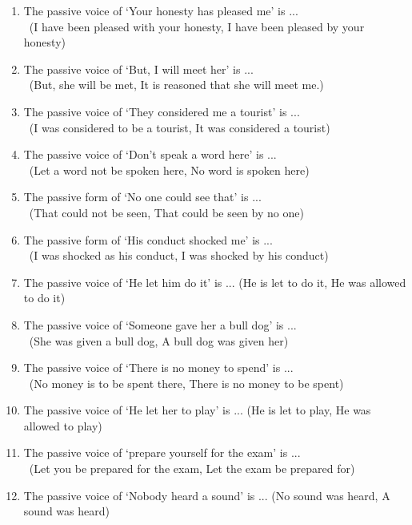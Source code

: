 \documentclass[12pt]{article}
\newcommand{\enter}{\\\textcolor{white}{1}}
\begin{document}
\begin{enumerate}
    \item The passive voice of `Your honesty has pleased me' is ...
      \enter\hfill (I have been pleased with your honesty, I have been pleased by your honesty)

    \item The passive voice of `But, I will meet her' is ... 
      \enter\hfill (But, she will be met, It is reasoned that she will meet me.)

    \item The passive voice of `They considered me a tourist' is ... 
      \enter\hfill (I was considered to be a tourist, It was considered a tourist)

    \item The passive voice of `Don't speak a word here' is ... 
      \enter\hfill (Let a word not be spoken here, No word is spoken here)

    \item The passive form of `No one could see that' is ... 
      \enter\hfill (That could not be seen, That could be seen by no one)

    \item The passive form of `His conduct shocked me' is ... 
      \enter\hfill (I was shocked as his conduct, I was shocked by his conduct)

    \item The passive voice of `He let him do it' is ... \hfill (He is let to do it, He was allowed to do it)

    \item The passive voice of `Someone gave her a bull dog' is ... 
      \enter\hfill (She was given a bull dog, A bull dog was given her)

    \item The passive voice of `There is no money to spend' is ... 
      \enter\hfill (No money is to be spent there, There is no money to be spent)

    \item The passive voice of `He let her to play' is ... \hfill (He is let to play, He was allowed to play)

    \item The passive voice of `prepare yourself for the exam' is ... 
      \enter\hfill (Let you be prepared for the exam, Let the exam be prepared for)

    \item The passive voice of `Nobody heard a sound' is ... \hfill (No sound was heard, A sound was heard)


\end{enumerate}
\end{document}
